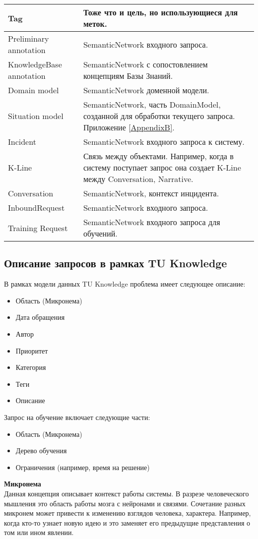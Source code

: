 \begin{longtable}{|p{5cm}|p{12cm}|}
   \hline
   Tag & Тоже что и цель, но использующиеся для меток. \\
   \hline
   Preliminary annotation  & SemanticNetwork входного запроса. \\
   \hline
   KnowledgeBase annotation  & SemanticNetwork с сопостовлением концепциям Базы Знаний. \\
   \hline
   Domain model  & SemanticNetwork доменной модели. \\
   \hline
   Situation model  & SemanticNetwork, часть DomainModel, созданной для обработки текущего запроса. Приложение \ref{AppendixB}. \\
   \hline
   Incident  & SemanticNetwork входного запроса к систему. \\
   \hline
   K-Line  & Связь между объектами. Например, когда в систему поступает запрос она создает K-Line между Conversation, Narrative. \\
   \hline
   Conversation  & SemanticNetwork, контекст инцидента. \\
   \hline
   InboundRequest  & SemanticNetwork входного запроса. \\
   \hline
   Training Request  & SemanticNetwork входного запроса для обучений. \\
   \hline
   
  \end{longtable}

\subsection{Описание запросов в рамках TU Knowledge}
В рамках модели данных TU Knowledge проблема имеет следующее описание:
\begin{itemize}
	\item Область (Микронема)
	\item Дата обращения
	\item Автор
	\item Приоритет
	\item Категория
	\item Теги
	\item Описание
\end{itemize}
Запрос на обучение включает следующие части:
\begin{itemize}
	\item Область (Микронема)
	\item Дерево обучения
	\item Ограничения (например, время на решение)
\end{itemize}
 \textbf{Микронема} \\
Данная концепция описывает контекст работы системы. В разрезе человеческого мышления это область работы мозга с нейронами и связями. Сочетание разных микронем может привести к изменению взглядов человека, характера. Например, когда кто-то узнает новую идею и это заменяет его предыдущие представления о том или ином явлении.  
